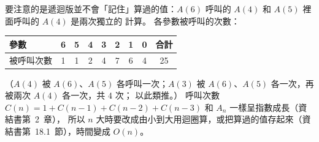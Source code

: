 \begin{pastsoln}
要注意的是遞迴版並不會「記住」算過的值：$A(6)$ 呼叫的 $A(4)$ 和 $A(5)$ 裡面呼叫的 $A(4)$ 是兩次獨立的
計算。 各參數被呼叫的次數：
\begin{center}
\begin{tabular}{lcccccccc}
\toprule
參數 & 6 & 5 & 4 & 3 & 2 & 1 & 0 & 合計 \\
\midrule
被呼叫次數 & 1 & 1 & 2 & 4 & 7 & 6 & 4 & 25 \\
\bottomrule
\end{tabular}
\end{center}
（$A(4)$ 被 $A(6)$、$A(5)$ 各呼叫一次；$A(3)$ 被 $A(6)$、$A(5)$ 各一次，再被兩次 $A(4)$ 各一次，共 $4$ 次；
以此類推。） 呼叫次數 $C(n) = 1 + C(n-1) + C(n-2) + C(n-3)$ 和 $A_n$ 一樣呈指數成長（資結書第~2~章），
所以 $n$ 大時要改成由小到大用迴圈算，或把算過的值存起來（資結書第~18.1~節），時間變成 $O(n)$。
\end{pastsoln}
